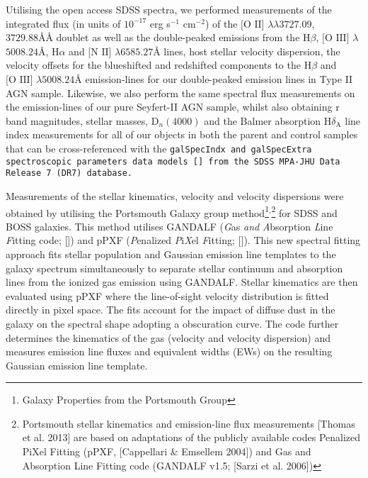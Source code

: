Utilising the open access SDSS spectra, we performed measurements of the integrated flux (in units of $10^{-17}$ erg s$^{-1}$ cm$^{-2}$) of the $\text{[O II]}$ $\lambda\lambda$$3727.09$, $3729.88ÅÅ$ doublet as well as the double-peaked emissions from the $\text{H}\beta$, $\text{[O III]}$ $\lambda$$5008.24Å$, $\text{H}\alpha$ and $\text{[N II]}$ $\lambda$$6585.27Å$ lines, host stellar velocity dispersion, the velocity offsets for the blueshifted and redshifted components to the $\text{H}\beta$ and $\text{[O III]}$ $\lambda$$5008.24Å$ emission-lines for our double-peaked emission lines in Type II AGN sample. Likewise, we also perform the same spectral flux measurements on the emission-lines of our pure Seyfert-II AGN sample, whilst also obtaining r band magnitudes, stellar masses, $\text{D}_{n}(4000)$ and the Balmer absorption $\text{H}\delta_{\text{A}}$ line index measurements for all of our objects in both the parent and control samples that can be cross-referenced with the \tt{galSpecIndx} and \tt{galSpecExtra} spectroscopic parameters data models [\cite{Kauffmann_2004}] from the SDSS MPA-JHU Data Release 7 (DR7) database. 

Measurements of the stellar kinematics, velocity and velocity dispersions were obtained by utilising the Portsmouth Galaxy group method\footnote{\tiny{Galaxy Properties from the Portsmouth Group}}$^{\text{,}}$\footnote{\tiny{Portsmouth stellar kinematics and emission-line flux measurements [Thomas et al. 2013] are based on adaptations of the publicly available codes Penalized PiXel Fitting (pPXF, [Cappellari \& Emsellem 2004]) and Gas and Absorption Line Fitting code (GANDALF v1.5; [Sarzi et al. 2006])}} for SDSS and BOSS galaxies. This method utilises GANDALF (\textit{G}as \textit{and} \textit{A}bsorption \textit{L}ine \textit{F}itting code; [\cite{Sarzi_2006}]) and pPXF (\textit{P}enalized \textit{P}i\textit{X}el \textit{F}itting; [\cite{2012ascl.soft10002C}]). This new spectral fitting approach fits stellar population and Gaussian emission line templates to the galaxy spectrum simultaneously to separate stellar continuum and absorption lines from the ionized gas emission using GANDALF. Stellar kinematics are then evaluated using pPXF where the line-of-sight velocity distribution is fitted directly in pixel space. The fits account for the impact of diffuse dust in the galaxy on the spectral shape adopting a \cite{Calzetti_2001} obscuration curve. The code further determines the kinematics of the gas (velocity and velocity dispersion) and measures emission line fluxes and equivalent widths (EWs) on the resulting Gaussian emission line template.


